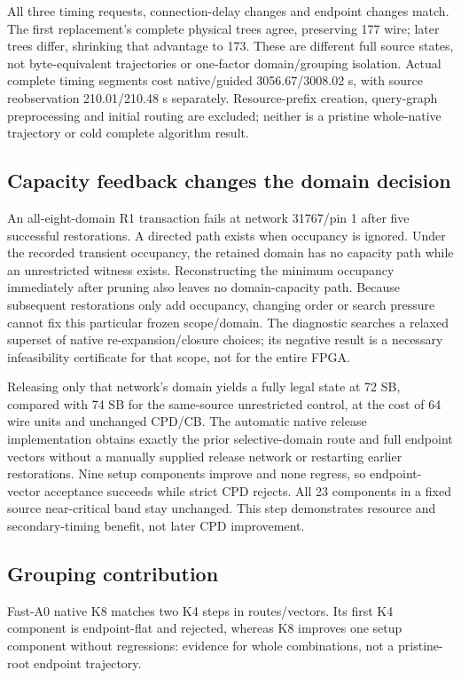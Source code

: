 \documentclass[conference,10pt]{IEEEtran}
\begin{document}
All three timing requests, connection-delay changes and endpoint changes match. The first replacement's complete physical trees agree, preserving 177 wire; later trees differ, shrinking that advantage to 173. These are different full source states, not byte-equivalent trajectories or one-factor domain/grouping isolation. Actual complete timing segments cost native/guided 3056.67/3008.02 s, with source reobservation 210.01/210.48 s separately. Resource-prefix creation, query-graph preprocessing and initial routing are excluded; neither is a pristine whole-native trajectory or cold complete algorithm result.

\subsection{Capacity feedback changes the domain decision}
An all-eight-domain R1 transaction fails at network 31767/pin 1 after five successful restorations. A directed path exists when occupancy is ignored. Under the recorded transient occupancy, the retained domain has no capacity path while an unrestricted witness exists. Reconstructing the minimum occupancy immediately after pruning also leaves no domain-capacity path. Because subsequent restorations only add occupancy, changing order or search pressure cannot fix this particular frozen scope/domain. The diagnostic searches a relaxed superset of native re-expansion/closure choices; its negative result is a necessary infeasibility certificate for that scope, not for the entire FPGA.

Releasing only that network's domain yields a fully legal state at 72 SB, compared with 74 SB for the same-source unrestricted control, at the cost of 64 wire units and unchanged CPD/CB. The automatic native release implementation obtains exactly the prior selective-domain route and full endpoint vectors without a manually supplied release network or restarting earlier restorations. Nine setup components improve and none regress, so endpoint-vector acceptance succeeds while strict CPD rejects. All 23 components in a fixed source near-critical band stay unchanged. This step demonstrates resource and secondary-timing benefit, not later CPD improvement.

\subsection{Grouping contribution}
Fast-A0 native K8 matches two K4 steps in routes/vectors. Its first K4 component is endpoint-flat and rejected, whereas K8 improves one setup component without regressions: evidence for whole combinations, not a pristine-root endpoint trajectory.
\end{document}
